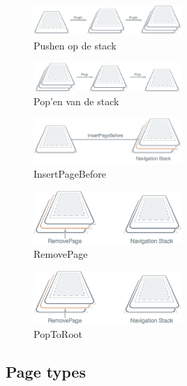 \documentclass{article}
\begin{document}
\begin{figure}[H]
    \centering
    \includegraphics[width=0.5\textwidth]{navigation-stack-1.png}
    \caption{Pushen op de stack}
\end{figure}


\begin{figure}[H]
    \centering
    \includegraphics[width=0.5\textwidth]{navigation-stack-2.png}
    \caption{Pop'en van de stack}
\end{figure}

\begin{figure}[H]
    \centering
    \includegraphics[width=0.5\textwidth]{navigation-stack-3.png}
    \caption{InsertPageBefore}
\end{figure}

\begin{figure}[H]
    \centering
    \includegraphics[width=0.5\textwidth]{navigation-stack-4.png}
    \caption{RemovePage}
\end{figure}


\begin{figure}[H]
    \centering
    \includegraphics[width=0.5\textwidth]{navigation-stack-4.png}
    \caption{PopToRoot}
\end{figure}

\subsection{Page types}
\end{document}
